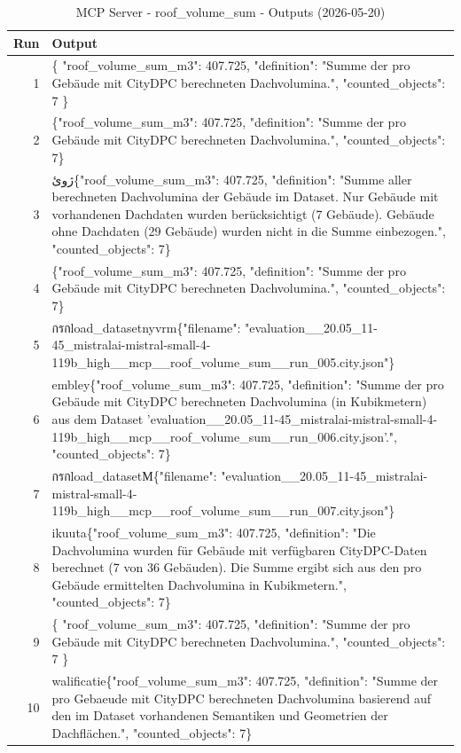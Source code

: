 \documentclass[a4paper,11pt]{article}
\begin{document}
\begin{table}[ht]
\centering
\scriptsize
\caption{MCP Server - roof\_volume\_sum - Outputs (2026-05-20)}
\label{tab:mcp\_roof\_volume\_sum\_outputs\_2026-05-20}
\begin{tabular}{r p{12cm}}
\hline
Run & Output \\
\hline
1 & \{
  "roof\_volume\_sum\_m3": 407.725,
  "definition": "Summe der pro Gebäude mit CityDPC berechneten Dachvolumina.",
  "counted\_objects": 7
\} \\
2 & \{"roof\_volume\_sum\_m3": 407.725, "definition": "Summe der pro Gebäude mit CityDPC berechneten Dachvolumina.", "counted\_objects": 7\} \\
3 &  ژوئ\{"roof\_volume\_sum\_m3": 407.725, "definition": "Summe aller berechneten Dachvolumina der Gebäude im Dataset. Nur Gebäude mit vorhandenen Dachdaten wurden berücksichtigt (7 Gebäude). Gebäude ohne Dachdaten (29 Gebäude) wurden nicht in die Summe einbezogen.", "counted\_objects": 7\} \\
4 & \{"roof\_volume\_sum\_m3": 407.725, "definition": "Summe der pro Gebäude mit CityDPC berechneten Dachvolumina.", "counted\_objects": 7\} \\
5 &  กรกload\_datasetnyvrm\{"filename": "evaluation\_\_20.05\_11-45\_mistralai-mistral-small-4-119b\_high\_\_mcp\_\_roof\_volume\_sum\_\_run\_005.city.json"\} \\
6 & embley\{"roof\_volume\_sum\_m3": 407.725, "definition": "Summe der pro Gebäude mit CityDPC berechneten Dachvolumina (in Kubikmetern) aus dem Dataset 'evaluation\_\_20.05\_11-45\_mistralai-mistral-small-4-119b\_high\_\_mcp\_\_roof\_volume\_sum\_\_run\_006.city.json'.", "counted\_objects": 7\} \\
7 &  กรกload\_datasetМ\{"filename": "evaluation\_\_20.05\_11-45\_mistralai-mistral-small-4-119b\_high\_\_mcp\_\_roof\_volume\_sum\_\_run\_007.city.json"\} \\
8 & ikuuta\{"roof\_volume\_sum\_m3": 407.725, "definition": "Die Dachvolumina wurden für Gebäude mit verfügbaren CityDPC-Daten berechnet (7 von 36 Gebäuden). Die Summe ergibt sich aus den pro Gebäude ermittelten Dachvolumina in Kubikmetern.", "counted\_objects": 7\} \\
9 & \{
  "roof\_volume\_sum\_m3": 407.725,
  "definition": "Summe der pro Gebäude mit CityDPC berechneten Dachvolumina.",
  "counted\_objects": 7
\} \\
10 & walificatie\{"roof\_volume\_sum\_m3": 407.725, "definition": "Summe der pro Gebaeude mit CityDPC berechneten Dachvolumina basierend auf den im Dataset vorhandenen Semantiken und Geometrien der Dachflächen.", "counted\_objects": 7\} \\

\end{tabular}
\end{table}
\end{document}
